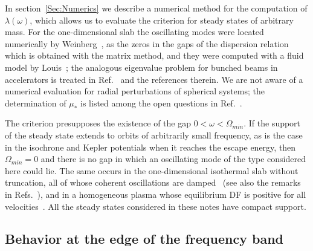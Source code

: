 In section~\ref{Sec:Numerics} we describe a numerical method for the computation of $\lambda(\omega)$, which allows us to evaluate the criterion for steady states of arbitrary mass. For the one-dimensional slab the oscillating modes were located numerically by Weinberg~\cite{mW91}, as the zeros in the gaps of the dispersion relation which is obtained with the matrix method, and they were computed with a fluid model by Louis~\cite{pL92}; the analogous eigenvalue problem for bunched beams in accelerators is treated in Ref.~\cite{iKtAeS21} and the references therein. We are not aware of a numerical evaluation for radial perturbations of spherical systems; the determination of $\mu_*$ is listed among the open questions in Ref.~\cite{mK22}. 

The criterion presupposes the existence of the gap $0 < \omega < \Omega_{min}$. If the support of the steady state extends to orbits of arbitrarily small frequency, as is the case in the isochrone and Kepler potentials when it reaches the escape energy, then $\Omega_{min} = 0$ and there is no gap in which an oscillating mode of the type considered here could lie. The same occurs in the one-dimensional isothermal slab without truncation, all of whose coherent oscillations are damped~\cite{lWgB15} (see also the remarks in Refs.~\cite{sM90,mW91}), and in a homogeneous plasma whose equilibrium DF is positive for all velocities~\cite{tN26}. All the steady states considered in these notes have compact support.


\subsection{Behavior at the edge of the frequency band}
\label{SubSec:Edge}

